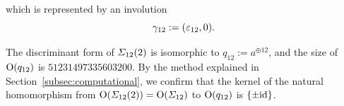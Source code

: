 \documentclass{amsart} %
\begin{document}
 which is 
 represented by an involution 
 \[
 \gamma_{12}:=(\varepsilon_{12}, 0).
 \]
 \begin{remark}\label{rem:q12}
 The discriminant form of $\varSigma_{12}(2)$ is isomorphic to
 $q_{12}:=a^{\oplus 12}$, 
and the size of $\mathord{\mathrm{O}}(q_{12})$ is $51231497335603200$.
 By the method  explained  in Section~\ref{subsec:computational},
 we confirm that the kernel of the natural homomorphism from 
 $\mathord{\mathrm{O}}(\varSigma_{12}(2))=\mathord{\mathrm{O}}(\varSigma_{12})$ to $\mathord{\mathrm{O}}(q_{12})$ 
 is $\{\pm \mathord{\mathrm{id}}\}$.
 \end{remark}
\end{document}
